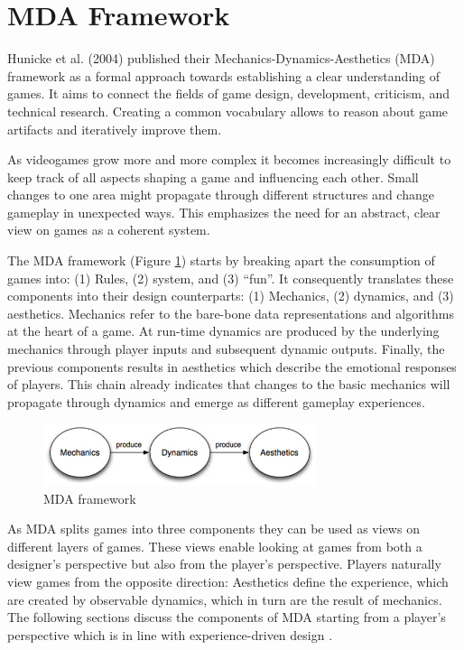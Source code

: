 \section{MDA Framework} \label{sec:mda}
Hunicke et al. (2004) \cite{Hunicke2004} published their Mechanics-Dynamics-Aesthetics (MDA) framework as a formal approach towards establishing a clear understanding of games.
It aims to connect the fields of game design, development, criticism, and technical research.
Creating a common vocabulary allows to reason about game artifacts and iteratively improve them.

As videogames grow more and more complex it becomes increasingly difficult to keep track of all aspects shaping a game and influencing each other.
Small changes to one area might propagate through different structures and change gameplay in unexpected ways.
This emphasizes the need for an abstract, clear view on games as a coherent system.

The MDA framework (Figure \ref{fig:mda}) starts by breaking apart the consumption of games into: (1) Rules, (2) system, and (3) ``fun''.
It consequently translates these components into their design counterparts: (1) Mechanics, (2) dynamics, and (3) aesthetics.
Mechanics refer to the bare-bone data representations and algorithms at the heart of a game.
At run-time dynamics are produced by the underlying mechanics through player inputs and subsequent dynamic outputs.
Finally, the previous components results in aesthetics which describe the emotional responses of players.
This chain already indicates that changes to the basic mechanics will propagate through dynamics and emerge as different gameplay experiences.

\begin{figure}[H]
    \centering
    \includegraphics[width=8cm]{assets/mda.jpg}
    \caption{MDA framework\protect\footnotemark}
    \label{fig:mda}
\end{figure}

As MDA splits games into three components they can be used as views on different layers of games.
These views enable looking at games from both a designer's perspective but also from the player's perspective.
Players naturally view games from the opposite direction: Aesthetics define the experience, which are created by observable dynamics, which in turn are the result of mechanics.
The following sections discuss the components of MDA starting from a player's perspective which is in line with experience-driven design \cite{Hunicke2004}.

